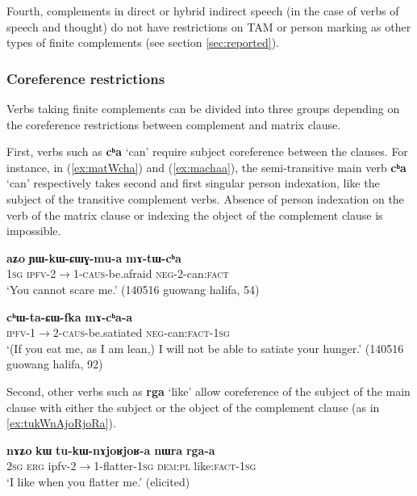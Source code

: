 \documentclass[oneside,a4paper,11pt]{article}
\newcommand{\ipa}[1]{\textbf{\phon#1}} %
\newcommand{\jpg}[2]{\ipa{#1} `#2'} %
\begin{document}
Fourth, complements in direct or hybrid indirect speech (in the case of verbs of speech and thought) do not have restrictions on TAM or person marking as other types of finite complements (see section \ref{sec:reported}).

\subsubsection{Coreference restrictions} \label{sec:finitie.coref}
Verbs taking finite complements can be divided into three groups depending on the coreference restrictions between complement and matrix clause.

First, verbs such as \jpg{cʰa}{can} require subject coreference between the clauses. For instance, in (\ref{ex:matWcha}) and (\ref{ex:machaa}), the semi-transitive main verb \jpg{cʰa}{can} respectively takes second and first singular person indexation, like the subject of the transitive complement verbs. Absence of person indexation on the verb of the matrix clause or indexing the object of the complement clause is impossible.

\begin{exe}
\ex \label{ex:matWcha}
\gll \ipa{aʑo} 	\ipa{ɲɯ-kɯ-ɕɯɣ-mu-a} 	\ipa{mɤ-tɯ-cʰa} \\
\textsc{1sg} \textsc{ipfv-2$\rightarrow$1-caus}-be.afraid \textsc{neg}-2-can:\textsc{fact} \\
\glt `You cannot scare me.' (140516 guowang halifa, 54)
\end{exe}

\begin{exe}
\ex \label{ex:machaa}
\gll
\ipa{cʰɯ-ta-ɕɯ-fka} 	\ipa{mɤ-cʰa-a} \\
\textsc{ipfv-1$\rightarrow$2-caus}-be.satiated \textsc{neg}-can:\textsc{fact-1sg} \\
\glt `(If you eat me, as I am lean,) I will not be able to satiate your hunger.' (140516 guowang halifa, 92)
\end{exe}

Second, other verbs such as \jpg{rga}{like} allow coreference of the subject of the main clause with either the subject or the object of the complement clause (as in \ref{ex:tukWnAjoRjoRa}).

\begin{exe}
\ex \label{ex:tukWnAjoRjoRa}
\gll \ipa{nɤʑo} \ipa{kɯ} \ipa{tu-kɯ-nɤjoʁjoʁ-a} \ipa{nɯra}	\ipa{rga-a} \\
\textsc{2sg} \textsc{erg} ipfv-2$\rightarrow$1-flatter-\textsc{1sg} \textsc{dem:pl} like:\textsc{fact-1sg} \\
\glt `I like when you flatter me.' (elicited)
\end{exe}
\end{document}
